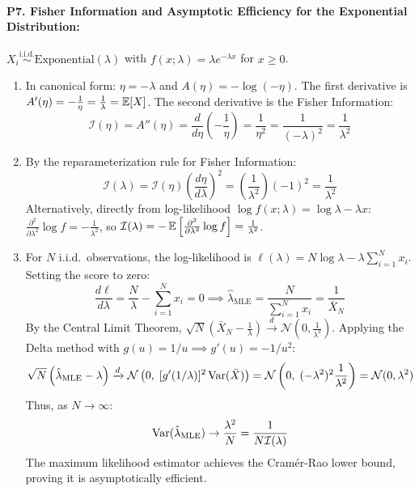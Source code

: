 \paragraph{P7. Fisher Information and Asymptotic Efficiency for the Exponential Distribution:}
$X_i \stackrel{\text{i.i.d.}}{\sim} \text{Exponential}(\lambda)$ with $f(x; \lambda) = \lambda e^{-\lambda x}$ for $x \ge 0$.
\begin{enumerate}[label=(\alph*)]
    \item In canonical form: $\eta = -\lambda$ and $A(\eta) = -\log(-\eta)$.
    The first derivative is $A'(\eta) = -\frac{1}{\eta} = \frac{1}{\lambda} = \operatorname{\mathbb{E}}[X]$.
    The second derivative is the Fisher Information:
    \begin{equation*}
    \mathcal{I}(\eta) = A''(\eta) = \frac{d}{d\eta}\left(-\frac{1}{\eta}\right) = \frac{1}{\eta^2} = \frac{1}{(-\lambda)^2} = \frac{1}{\lambda^2}
    \end{equation*}
    \item By the reparameterization rule for Fisher Information:
    \begin{equation*}
    \mathcal{I}(\lambda) = \mathcal{I}(\eta) \left( \frac{d\eta}{d\lambda} \right)^2 = \left(\frac{1}{\lambda^2}\right) (-1)^2 = \frac{1}{\lambda^2}
    \end{equation*}
    Alternatively, directly from log-likelihood $\log f(x; \lambda) = \log\lambda - \lambda x$:
    $\frac{\partial^2}{\partial \lambda^2} \log f = -\frac{1}{\lambda^2}$, so $\mathcal{I}(\lambda) = -\operatorname{\mathbb{E}}\left[\frac{\partial^2}{\partial \lambda^2} \log f\right] = \frac{1}{\lambda^2}$.
    \item For $N$ i.i.d.\ observations, the log-likelihood is $\ell(\lambda) = N\log\lambda - \lambda \sum_{i=1}^N x_i$. Setting the score to zero:
    \begin{equation*}
    \frac{d\ell}{d\lambda} = \frac{N}{\lambda} - \sum_{i=1}^N x_i = 0 \implies \hat{\lambda}_{\text{MLE}} = \frac{N}{\sum_{i=1}^N x_i} = \frac{1}{\bar{X}_N}
    \end{equation*}
    By the Central Limit Theorem, $\sqrt{N}(\bar{X}_N - \frac{1}{\lambda}) \xrightarrow{d} \mathcal{N}(0, \frac{1}{\lambda^2})$.
    Applying the Delta method with $g(u) = 1/u \implies g'(u) = -1/u^2$:
    \begin{equation*}
    \sqrt{N}\left( \hat{\lambda}_{\text{MLE}} - \lambda \right) \xrightarrow{d} \mathcal{N}\left( 0, \; [g'(1/\lambda)]^2 \operatorname{Var}(\bar{X}) \right) = \mathcal{N}\left( 0, \; (-\lambda^2)^2 \frac{1}{\lambda^2} \right) = \mathcal{N}(0, \lambda^2)
    \end{equation*}
    Thus, as $N \to \infty$:
    \begin{equation*}
    \operatorname{Var}(\hat{\lambda}_{\text{MLE}}) \to \frac{\lambda^2}{N} = \frac{1}{N \mathcal{I}(\lambda)}
    \end{equation*}
    The maximum likelihood estimator achieves the Cramér-Rao lower bound, proving it is asymptotically efficient.
\end{enumerate}

